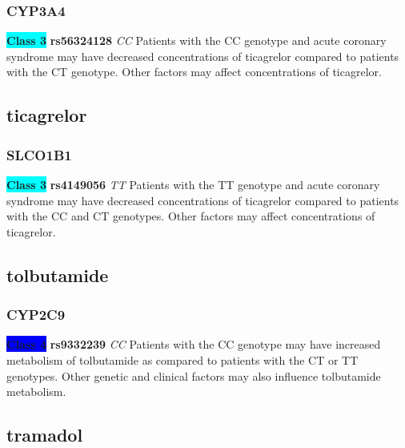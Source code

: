 \documentclass{book}
\begin{document}
\subsubsection{ CYP3A4 }

\begin{center}
\textbf{\colorbox{cyan} {Class 3}} \textbf{ rs56324128 } \textit{ CC }
Patients with the CC genotype and acute coronary syndrome may have decreased concentrations of ticagrelor compared to patients with the CT genotype. Other factors may affect concentrations of ticagrelor.


\end{center}\subsection{ ticagrelor }


\subsubsection{ SLCO1B1 }

\begin{center}
\textbf{\colorbox{cyan} {Class 3}} \textbf{ rs4149056 } \textit{ TT }
Patients with the TT genotype and acute coronary syndrome may have decreased concentrations of ticagrelor compared to patients with the CC and CT genotypes. Other factors may affect concentrations of ticagrelor.


\end{center}\subsection{ tolbutamide }


\subsubsection{ CYP2C9 }

\begin{center}

\textbf{\colorbox{blue} {Class 4}} \textbf{ rs9332239 } \textit{ CC }
Patients with the CC genotype may have increased metabolism of tolbutamide as compared to patients with the CT or TT genotypes. Other genetic and clinical factors may also influence tolbutamide metabolism.

\end{center}\subsection{ tramadol }
\end{document}
